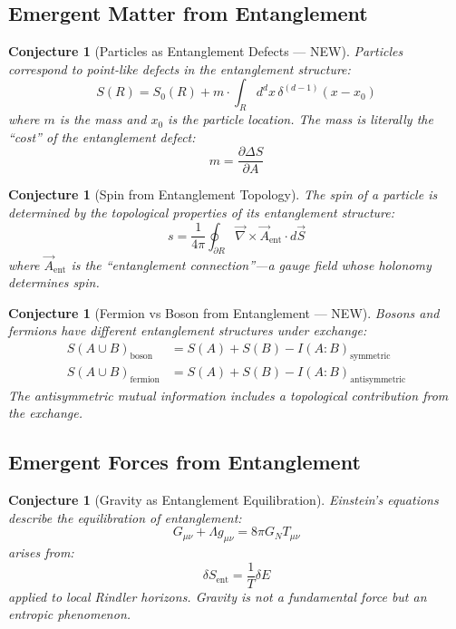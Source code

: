 \documentclass[12pt,a4paper]{article}
\newtheorem{conjecture}[theorem]{Conjecture}
\begin{document}
\subsection{Emergent Matter from Entanglement}

\begin{conjecture}[Particles as Entanglement Defects --- NEW]
Particles correspond to point-like defects in the entanglement structure:
\begin{equation}
S(R) = S_0(R) + m \cdot \int_R d^d x \, \delta^{(d-1)}(x - x_0)
\end{equation}
where $m$ is the mass and $x_0$ is the particle location. The mass is literally the ``cost'' of the entanglement defect:
\begin{equation}
m = \frac{\partial \Delta S}{\partial A}
\end{equation}
\end{conjecture}

\begin{conjecture}[Spin from Entanglement Topology]
The spin of a particle is determined by the topological properties of its entanglement structure:
\begin{equation}
s = \frac{1}{4\pi} \oint_{\partial R} \vec{\nabla} \times \vec{A}_{\text{ent}} \cdot d\vec{S}
\end{equation}
where $\vec{A}_{\text{ent}}$ is the ``entanglement connection''---a gauge field whose holonomy determines spin.
\end{conjecture}

\begin{conjecture}[Fermion vs Boson from Entanglement --- NEW]
Bosons and fermions have different entanglement structures under exchange:
\begin{align}
S(A \cup B)_{\text{boson}} &= S(A) + S(B) - I(A:B)_{\text{symmetric}} \\
S(A \cup B)_{\text{fermion}} &= S(A) + S(B) - I(A:B)_{\text{antisymmetric}}
\end{align}
The antisymmetric mutual information includes a topological contribution from the exchange.
\end{conjecture}

\subsection{Emergent Forces from Entanglement}

\begin{conjecture}[Gravity as Entanglement Equilibration]
Einstein's equations describe the equilibration of entanglement:
\begin{equation}
G_{\mu\nu} + \Lambda g_{\mu\nu} = 8\pi G_N T_{\mu\nu}
\end{equation}
arises from:
\begin{equation}
\delta S_{\text{ent}} = \frac{1}{T} \delta E
\end{equation}
applied to local Rindler horizons. Gravity is not a fundamental force but an entropic phenomenon.
\end{conjecture}
\end{document}
